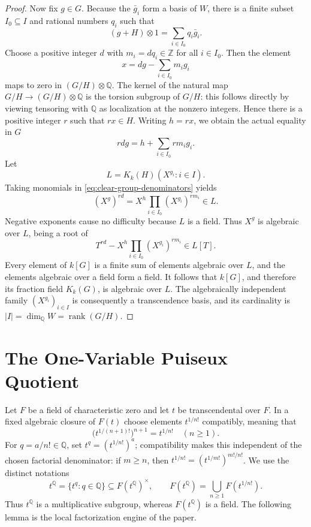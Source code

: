 \documentclass[11pt,a4paper]{article}
\numberwithin{equation}{section}
\theoremstyle{plain}
\theoremstyle{definition}
\theoremstyle{remark}
\newcommand{\Q}{\mathbb Q}
\newcommand{\Z}{\mathbb Z}
\newcommand{\rk}{\operatorname{rank}}
\newcommand{\Kk}[1]{K_k(#1)}
\newcommand{\mon}[1]{X^{#1}}
\begin{document}
\begin{proof}
Now fix $g\in G$.  Because the $\bar g_i$ form a basis of $W$, there is a
finite subset $I_0\subseteq I$ and rational numbers $q_i$ such that
\[
  (g+H)\otimes1=\sum_{i\in I_0}q_i\bar g_i.
\]
Choose a positive integer $d$ with $m_i=dq_i\in\Z$ for all $i\in I_0$.
Then the element
\[
  x=dg-\sum_{i\in I_0}m_i g_i
\]
maps to zero in $(G/H)\otimes\Q$.  The kernel of the natural map
$G/H\to(G/H)\otimes\Q$ is the torsion subgroup of $G/H$: this follows
directly by viewing tensoring with $\Q$ as localization at the nonzero
integers.  Hence there is a
positive integer $r$ such that $rx\in H$.  Writing $h=rx$, we obtain the
actual equality in $G$
\begin{equation}\label{eq:clear-group-denominators}
  rdg=h+\sum_{i\in I_0}rm_i g_i.
\end{equation}
Let
\[
  L=\Kk H(\mon{g_i}:i\in I).
\]
Taking monomials in \cref{eq:clear-group-denominators} yields
\[
  (\mon g)^{rd}=\mon h\prod_{i\in I_0}(\mon{g_i})^{rm_i}\in L.
\]
Negative exponents cause no difficulty because $L$ is a field.  Thus
$\mon g$ is algebraic over $L$, being a root of
\[
  T^{rd}-\mon h\prod_{i\in I_0}(\mon{g_i})^{rm_i}\in L[T].
\]
Every element of $k[G]$ is a finite sum of elements algebraic over $L$, and
the elements algebraic over a field form a field.  It follows that
$k[G]$, and therefore its fraction field $\Kk G$, is algebraic over $L$.
The algebraically independent family $(\mon{g_i})_{i\in I}$ is consequently
a transcendence basis, and its cardinality is
$|I|=\dim_\Q W=\rk(G/H)$.
\end{proof}

\section{The One-Variable Puiseux Quotient}\label{sec:puiseux}

Let $F$ be a field of characteristic zero and let $t$ be transcendental over
$F$.  In a fixed algebraic closure of $F(t)$ choose elements
$t^{1/n!}$ compatibly, meaning that
\[
  \bigl(t^{1/(n+1)!}\bigr)^{n+1}=t^{1/n!}
  \quad(n\geq1).
\]
For $q=a/n!\in\Q$, set $t^q=(t^{1/n!})^a$; compatibility makes this
independent of the chosen factorial denominator: if $m\geq n$, then
$t^{1/n!}=(t^{1/m!})^{m!/n!}$.  We use the distinct
notations
\[
  t^\Q=\{t^q:q\in\Q\}\subseteq F(t^\Q)^\times,
  \qquad
  F(t^{\Q})=\bigcup_{n\geq1}F(t^{1/n!}).
\]
Thus $t^\Q$ is a multiplicative subgroup, whereas $F(t^\Q)$ is a field.
The following lemma is the local factorization engine of the paper.
\end{document}
